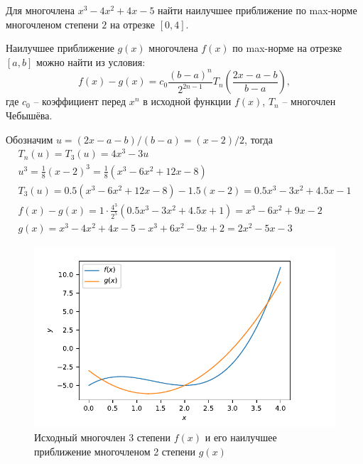 \newpage



\newpage
\begin{problem}
    Для многочлена $x^3 - 4x^2 + 4x - 5$ найти наилучшее приближение по
    max-норме многочленом степени $2$ на отрезке $[0, 4]$.
\end{problem}

Наилучшее приближение $g(x)$ многочлена $f(x)$ по max-норме на отрезке $[a, b]$
можно найти из условия:
\begin{equation*}
    f(x) - g(x) = c_0 \frac{(b - a)^n}{2^{2n-1}}
                  T_n\left(\frac{2x - a - b}{b - a}\right),
\end{equation*}
где $c_0$ -- коэффициент перед $x^n$ в исходной функции $f(x)$,
$T_n$ -- многочлен Чебышёва.

Обозначим $u = (2x - a - b) / (b - a) = (x - 2) / 2$, тогда
\begin{gather*}
    T_n(u) = T_3(u) = 4x^3 - 3u\\
    u^3 = \frac{1}{8} (x - 2)^3 = \frac{1}{8} (x^3 - 6x^2 + 12x - 8)\\
    T_3(u) = 0.5 (x^3 - 6x^2 + 12x - 8) - 1.5 (x - 2) =
    0.5x^3 - 3x^2 + 4.5x - 1\\
    f(x) - g(x) = 1 \cdot \frac{4^3}{2^5} (0.5x^3 - 3x^2 + 4.5x + 1) =
    x^3 - 6x^2 + 9x - 2\\
    g(x) = x^3 - 4x^2 + 4x - 5 - x^3 + 6x^2 - 9x + 2 =
    2x^2 - 5x - 3
\end{gather*}

\begin{figure}[h]
    \centering
    \includegraphics*[scale=1.0]{./figures/ex5.pdf}
    \caption{Исходный многочлен 3 степени $f(x)$ и его наилучшее приближение
    многочленом 2 степени $g(x)$}
\end{figure}


